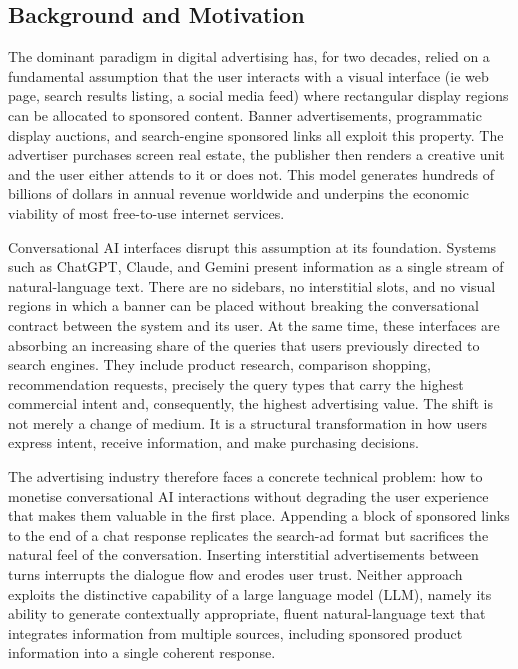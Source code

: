 \subsection{Background and Motivation}
\label{subsec:background}

The dominant paradigm in digital advertising has, for two decades, relied on a
fundamental assumption that the user interacts with a visual interface (ie web page, 
search results listing, a social media feed) where rectangular display regions
can be allocated to sponsored content. Banner advertisements, programmatic
display auctions, and search-engine sponsored links all exploit this property.
The advertiser purchases screen real estate, the publisher then renders a creative
unit and the user either attends to it or does not. This model generates
hundreds of billions of dollars in annual revenue worldwide and underpins the
economic viability of most free-to-use internet services.

Conversational AI interfaces disrupt this assumption at its foundation. Systems
such as ChatGPT, Claude, and Gemini present information as a single stream of
natural-language text. There are no sidebars, no interstitial slots, and no
visual regions in which a banner can be placed without breaking the
conversational contract between the system and its user. At the same time, these
interfaces are absorbing an increasing share of the queries that users
previously directed to search engines. They include product research, comparison shopping,
recommendation requests, precisely the query types that carry the highest
commercial intent and, consequently, the highest advertising value. The shift is
not merely a change of medium. It is a structural transformation in how users
express intent, receive information, and make purchasing decisions.

The advertising industry therefore faces a concrete technical problem: how to
monetise conversational AI interactions without degrading the user experience
that makes them valuable in the first place. Appending a block of sponsored
links to the end of a chat response replicates the search-ad format but
sacrifices the natural feel of the conversation. Inserting interstitial
advertisements between turns interrupts the dialogue flow and erodes user trust.
Neither approach exploits the distinctive capability of a large language model
(LLM), namely its ability to generate contextually appropriate, fluent
natural-language text that integrates information from multiple sources, including
sponsored product information into a single coherent response.

